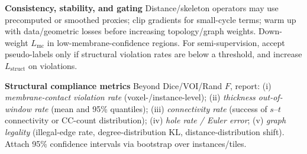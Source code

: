 \medskip
\noindent\textbf{Consistency, stability, and gating}\;
Distance/skeleton operators may use precomputed or smoothed proxies; clip gradients for small-cycle terms; warm up with data/geometric losses before increasing topology/graph weights.
Down-weight \(L_{\mathrm{mc}}\) in low-membrane-confidence regions.
For semi-supervision, accept pseudo-labels only if structural violation rates are below a threshold, and increase \(L_{\text{struct}}\) on violations.\par

\medskip
\noindent\textbf{Structural compliance metrics}\;
Beyond Dice/VOI/Rand \(F\), report:
(i) \emph{membrane-contact violation rate} (voxel-/instance-level);
(ii) \emph{thickness out-of-window rate} (mean and 95\% quantiles);
(iii) \emph{connectivity rate} (success of \(s\)--\(t\) connectivity or CC-count distribution);
(iv) \emph{hole rate / Euler error};
(v) \emph{graph legality} (illegal-edge rate, degree-distribution KL, distance-distribution shift).
Attach 95\% confidence intervals via bootstrap over instances/tiles.\par

